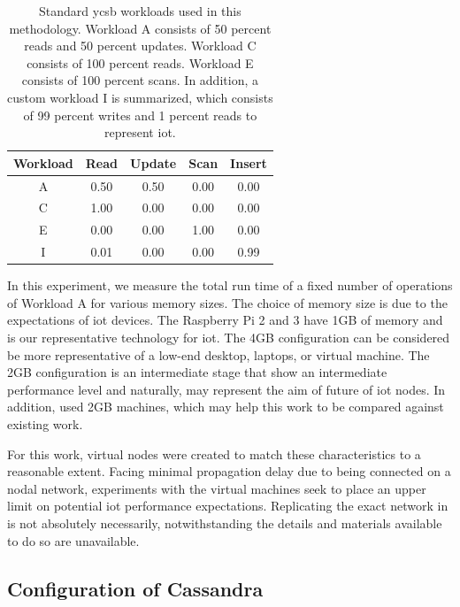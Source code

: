 \begin{table}
\begin{center}
 \begin{tabular}{||c c c c c||} 
 \hline
 Workload & Read & Update & Scan & Insert \\ [0.5ex] 
 \hline\hline
 A & 0.50 & 0.50 & 0.00 & 0.00 \\ 
 \hline
 C & 1.00 & 0.00 & 0.00 & 0.00 \\
 \hline
 E & 0.00 & 0.00 & 1.00 & 0.00\\ 
 \hline
 I & 0.01 & 0.00 & 0.00 & 0.99 \\ [1ex] 
 \hline
\end{tabular}
\end{center}

\caption{Standard \gls{ycsb} workloads used in this methodology.  Workload A consists of 50 percent reads and 50 percent updates.  Workload C consists of 100 percent reads.  Workload E consists of 100 percent scans.  In addition, a custom workload I is summarized, which consists of 99 percent writes and 1 percent reads to represent \gls{iot}.}
\label{table:std_workloads_with_i}
\end{table}

In this experiment, we measure the total run time of a fixed number of operations of Workload A for various memory sizes. The choice of memory size is due to the expectations of \gls{iot} devices. The Raspberry Pi 2 and 3 have 1GB of memory and is our representative technology for \gls{iot}. The 4GB configuration can be considered be more representative of a low-end desktop, laptops, or virtual machine. The 2GB configuration is an intermediate stage that show an intermediate performance level and naturally, may represent the aim of future of \gls{iot} nodes. In addition, \cite{Abramova2014} used 2GB machines, which may help this work to be compared against existing work.

For this work, virtual nodes were created to match these characteristics to a reasonable extent.  Facing minimal propagation delay due to being connected on a nodal network, experiments with the virtual machines seek to place an upper limit on potential \gls{iot} performance expectations. Replicating the exact network in \cite{Abramova2014} is not absolutely necessarily, notwithstanding the details and materials available to do so are unavailable.

\subsection{Configuration of Cassandra}

